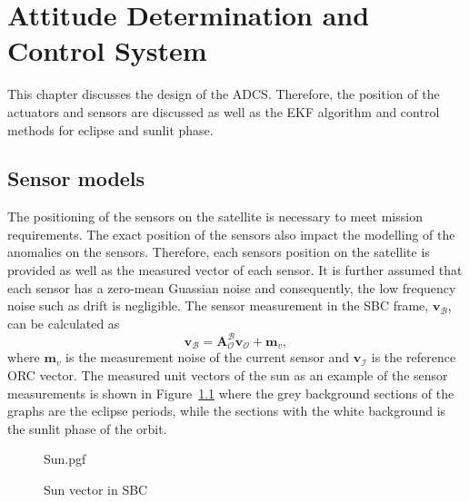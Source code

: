 \chapter{Attitude Determination and Control System}
\label{chap:ADCS}
This chapter discusses the design of the ADCS. Therefore, the position of the actuators and sensors are discussed as well as the EKF algorithm and control methods for eclipse and sunlit phase. 

\section{Sensor models}
The positioning of the sensors on the satellite is necessary to meet mission requirements. The exact position of the sensors also impact the modelling of the anomalies on the sensors. Therefore, each sensors position on the satellite is provided as well as the measured vector of each sensor. It is further assumed that each sensor has a zero-mean Guassian noise and consequently, the low frequency noise such as drift is negligible. The sensor measurement in the SBC frame, $\mathbf{v}_{\mathcal{B}}$,  can be calculated as
\begin{equation}
\mathbf{v}_{\mathcal{B}} = \boldsymbol{A}^{\mathcal{B}}_{\mathcal{O}} \mathbf{v}_\mathcal{O} + \mathbf{m}_v,
\end{equation}
where $\mathbf{m}_v$ is the measurement noise of the current sensor and $\mathbf{v}_{\mathcal{I}}$ is the reference ORC vector. The measured unit vectors of the sun as an example of the sensor measurements is shown in Figure~\ref{fig:SunSensorPlot} where the grey background sections of the graphs are the eclipse periods, while the sections with the white background is the sunlit phase of the orbit.

\begin{figure}[!htb]
	\centering
	\def\pgfwidth{7cm}
	{Sun.pgf}
	
	\caption{Sun vector in SBC}
	\label{fig:SunSensorPlot}
\end{figure}

%	
%
%	

